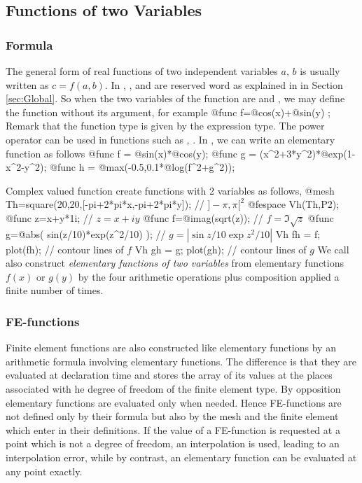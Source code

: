 \documentclass[a4paper,twoside,12pt]{book}
\def\setS#1{#1\label{sec:#1}}
\begin{document}
\subsection{Functions of two Variables}
\label{sec:TwoVarFunctions}
\subsubsection{\setS{Formula}}
The general form of real functions of two independent variables $a,\, b$ is
usually written as $c=f(a,b)$. In \freefempp, ,   and  are
reserved word as explained in in Section \ref{sec:Global}.
So when the  two variables of the function are  and ,
we may define the function without its argument, for example
\bFF
@func f=@cos(x)+@sin(y) ;
\eFF
Remark that the function type is given by the expression type.
The power operator can be used in functions such as
, .
In , we can write an elementary function as follows
\bFF
@func f = @sin(x)*@cos(y);
@func g = (x^2+3*y^2)*@exp(1-x^2-y^2);
@func h = @max(-0.5,0.1*@log(f^2+g^2));
\eFF

Complex valued function create functions with 2 variables  as follows,
\bFF
@mesh Th=square(20,20,[-pi+2*pi*x,-pi+2*pi*y]); // $]-\pi,\pi[^2$
@fespace Vh(Th,P2);
@func z=x+y*1i;  // $z=x+iy$
@func f=@imag(sqrt(z));  // $f=\Im\sqrt{z}$
@func g=@abs( sin(z/10)*exp(z^2/10) ); // $g=|\sin z/10\exp z^2/10|$
Vh fh = f; plot(fh);  // contour lines of $f$
Vh gh = g; plot(gh);  // contour lines of $g$
\eFF
We call also construct \emph{elementary functions of two variables }
from elementary functions $f(x)$ or $g(y)$
by the four arithmetic operations
plus composition applied a finite number of times.

\subsubsection{\setS{FE-functions}}
Finite element functions are also constructed like elementary functions by an
arithmetic formula involving elementary functions.  The difference is that they are
evaluated at declaration time and \freefempp stores the array of its values at the places associated with he degree of freedom of the finite element type.  By opposition elementary functions are evaluated only when needed.
Hence FE-functions are not defined only by their formula but also by the mesh and the finite element which enter in their definitions.  If the value of a FE-function is requested at a point which is not a degree of freedom, an interpolation is used, leading to an interpolation error, while by contrast, an elementary function can be evaluated at any point exactly.
\end{document}
